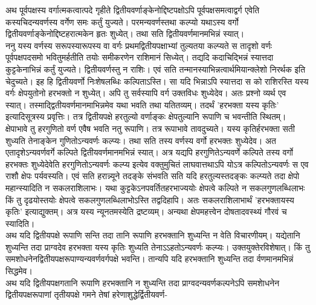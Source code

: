 \documentclass[11pt, openany]{book}
\begin{document}
\begin{sloppypar}
\hangindent=0.2in \hspace{0.2in}अथ पूर्वपक्षस्य वर्गात्मकत्वात्पदे गृहीते द्वितीयवर्णाङ्केनोद्दिष्टपक्षोऽपि पूर्वपक्षसमत्वाद्वर्ग एवेति कस्यचिदन्यवर्णस्य वर्गेण समः कर्तुं युज्यते। परमन्यवर्णस्तथा कल्प्यो यथाऽस्य वर्गो द्वितीयवर्णाङ्केनोद्दिष्टहरात्मकेन हृतः शुध्येत्। तथा सति द्वितीयवर्णमानमभिन्नं स्यात्।\\

\hangindent=0.2in \hspace{0.2in}ननु यस्य वर्णस्य सरूपस्यारूपस्य वा वर्गः प्रथमद्वितीयपक्षाभ्यां तुल्यतया कल्प्यते स तादृशो वर्णः पूर्वपक्षपदसमो भवितुमर्हतीति तयोः समीकरणेन राशिमानं सिध्येत्। तद्यदि कदाचिद्भिन्नं स्यात्तदा कुट्टकेनाभिन्नं कर्तुं युज्यते। द्वितीयवर्णस्तु न राशिः। एवं सति तन्मानस्याभिन्नत्वार्थमियान्क्लेशो निरर्थक इति चेदुच्यते। इह हि द्वितीयवर्णो निःशेषलब्धिः कल्पिताऽस्ति। सा यदि भिन्नाऽपि स्यात्तदा स को राशिरस्ति यस्य वर्गः क्षेपयुतोनो हरभक्तो न शुध्येत्। अपि तु सर्वस्यापि वर्ग उक्तविधः शुध्येदेव। अतः प्रश्नो व्यर्थ एव स्यात्। तस्माद्द्वितीयवर्णमानमाभिन्नमेव यथा भवति तथा यतितव्यम्। तदर्थं 'हरभक्ता यस्य कृतिः' इत्यादिसूत्रस्य प्रवृत्तिः। तत्र द्वितीयपक्षे हरतुल्यो वर्णाङ्कः क्षेपतुल्यानि रूपाणि च भवन्तीति स्थितम्। क्षेपाभावे तु हरगुणितो वर्ण एवैष भवति नतु रूपाणि। तत्र रूपाभावे तावदुच्यते। यस्य कृतिर्हरभक्ता सती शुध्यति तेनाङ्केन गुणितोऽन्यवर्णः कल्प्यः। तथा सति तस्य वर्णस्य वर्गो हरभक्तः शुध्येदेव। अत एतादृशेऽन्यवर्णवर्गे कल्पिते द्वितीयवर्णमानमभिन्नं स्यात्। अत्र यद्यपि हरगुणितेऽन्यवर्णे कल्पिते तस्य वर्गो हरभक्तः शुध्येदेवेति हरगुणितोऽन्यवर्णः कल्प्य इत्येव वक्तुमुचितं लाघवात्तथाऽपि योऽत्र कल्पितोऽन्यवर्णः स एव राशौ क्षेपः पर्यवस्यति। एवं सति हरान्न्यूने तदङ्के संभवति सति यदि हरतुल्यस्तदङ्कः कल्प्यते तदा क्षेपो महान्स्यादिति न सकलराशिलाभः। यथा कुट्टकेऽनपवर्तितहरभाज्ययोः क्षेपत्वे कल्पिते न सकलगुणलब्धिलाभः किं तु दृढयोस्तयोः क्षेपत्वे सकलगुणलब्धिलाभोऽस्ति तद्वदिहापि। अतः सकलराशिलाभार्थं 'हरभक्तायस्य कृतिः' इत्याद्युक्तम्। अत्र यस्य न्यूनतमस्येति द्रष्टव्यम्। अन्यथा क्षेपमहत्त्वेन दोषतादवस्थ्यं गौरवं च स्यादिति।\\

\hangindent=0.2in \hspace{0.2in}अथ यदि द्वितीयपक्षे रूपाणि सन्ति तदा तानि रूपाणि हरभक्तानि शुध्यन्ति न वेति विचारणीयम्। यद्येतानि शुध्यन्ति तदा प्राग्वदेव हरभक्ता यस्य कृतिः शुध्यति तेनाऽऽहतोऽन्यवर्णः कल्प्यः। उक्तयुक्तेरविशेषात्। किं तु समशोधनेनद्वितीयपक्षरूपाण्यन्यवर्णवर्गपक्षे भवन्ति। तान्यपि यदि हरभक्तानि शुध्यन्ति तदा र्वणमानमभिन्नं सिद्धमेव। \\

\hangindent=0.2in \hspace{0.2in}अथ यदि द्वितीयपक्षगतानि रूपाणि हरभक्तानि न शुध्यन्ति तदा प्राग्वदन्यवर्णकल्पनेऽपि समशेाधनेन द्वितीयपक्षरूपाणां तृतीयपक्षे गमने तेषां हरेणाशुद्धेर्द्वितीयवर्ण-
\end{sloppypar}
\thispagestyle{empty}
\newpage
\end{document}
